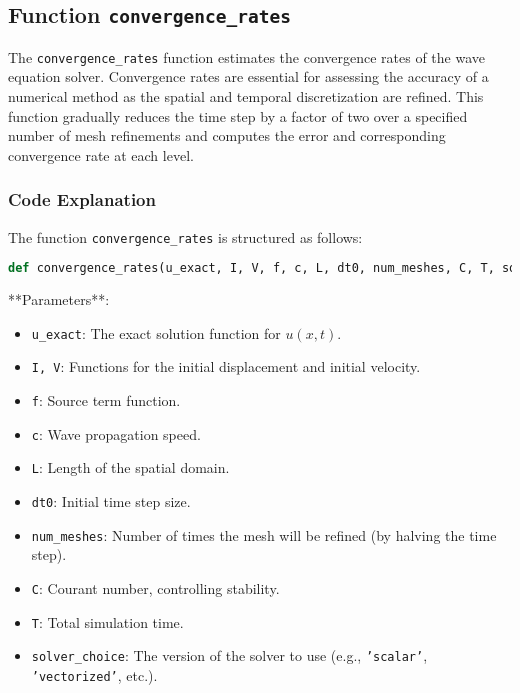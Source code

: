 \documentclass{article}
\begin{document}
		\subsection{Function \texttt{convergence\_rates}}
		
			The \texttt{convergence\_rates} function estimates the convergence rates of the wave equation solver. Convergence rates are essential for assessing the accuracy of a numerical method as the spatial and temporal discretization are refined. This function gradually reduces the time step by a factor of two over a specified number of mesh refinements and computes the error and corresponding convergence rate at each level.
			
			\subsubsection{Code Explanation}
			
			The function \texttt{convergence\_rates} is structured as follows:
			
			\begin{lstlisting}[language=Python, caption=Function Definition]
				def convergence_rates(u_exact, I, V, f, c, L, dt0, num_meshes, C, T, solver_choice='scalar'):
			\end{lstlisting}
			
			**Parameters**:
			\begin{itemize}
				\item \texttt{u\_exact}: The exact solution function for \( u(x, t) \).
				\item \texttt{I, V}: Functions for the initial displacement and initial velocity.
				\item \texttt{f}: Source term function.
				\item \texttt{c}: Wave propagation speed.
				\item \texttt{L}: Length of the spatial domain.
				\item \texttt{dt0}: Initial time step size.
				\item \texttt{num\_meshes}: Number of times the mesh will be refined (by halving the time step).
				\item \texttt{C}: Courant number, controlling stability.
				\item \texttt{T}: Total simulation time.
				\item \texttt{solver\_choice}: The version of the solver to use (e.g., \texttt{'scalar'}, \texttt{'vectorized'}, etc.).
			\end{itemize}
			
\end{document}
